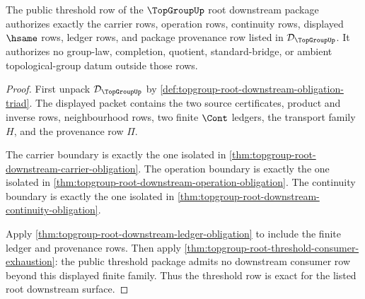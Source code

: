 \begin{theorem}
\label{thm:topgroup-root-downstream-threshold-exactness}
The public threshold row of the $\TopGroupUp$ root downstream package
authorizes exactly the carrier rows, operation rows, continuity rows, displayed
$\hsame$ rows, ledger rows, and package provenance row listed in
$\mathcal{D}_{\TopGroupUp}$. It authorizes no group-law, completion, quotient,
standard-bridge, or ambient topological-group datum outside those rows.
\end{theorem}
\begin{proof}
First unpack $\mathcal{D}_{\TopGroupUp}$ by
\autoref{def:topgroup-root-downstream-obligation-triad}. The displayed packet
contains the two source certificates, product and inverse rows, neighbourhood
rows, two finite $\Cont$ ledgers, the transport family $H$, and the provenance
row $\Pi$.

The carrier boundary is exactly the one isolated in
\autoref{thm:topgroup-root-downstream-carrier-obligation}. The operation
boundary is exactly the one isolated in
\autoref{thm:topgroup-root-downstream-operation-obligation}. The continuity
boundary is exactly the one isolated in
\autoref{thm:topgroup-root-downstream-continuity-obligation}.

Apply \autoref{thm:topgroup-root-downstream-ledger-obligation} to include the
finite ledger and provenance rows. Then apply
\autoref{thm:topgroup-root-threshold-consumer-exhaustion}: the public threshold
package admits no downstream consumer row beyond this displayed finite family.
Thus the threshold row is exact for the listed root downstream surface.
\end{proof}
